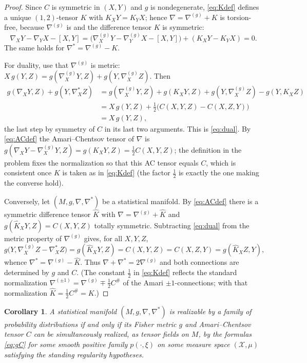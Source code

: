 \documentclass{amsart}
\newtheorem{corollary}{Corollary}
\theoremstyle{definition}
\theoremstyle{remark}
\begin{document}
\begin{proof}
Since $C$ is symmetric in $(X,Y)$ and $g$ is nondegenerate, \eqref{eq:Kdef}
defines a unique $(1,2)$-tensor $K$ with $K_{X}Y=K_{Y}X$; hence
$\nabla=\nabla^{(g)}+K$ is torsion-free, because $\nabla^{(g)}$ is and the
difference tensor $K$ is symmetric:
\[
  \nabla_{X}Y-\nabla_{Y}X-[X,Y]
   =\bigl(\nabla^{(g)}_{X}Y-\nabla^{(g)}_{Y}X-[X,Y]\bigr)+(K_{X}Y-K_{Y}X)=0 .
\]
The same holds for $\nabla^{*}=\nabla^{(g)}-K$.

For duality, use that $\nabla^{(g)}$ is metric:
$X\,g(Y,Z)=g(\nabla^{(g)}_{X}Y,Z)+g(Y,\nabla^{(g)}_{X}Z)$. Then
\begin{align*}
  g(\nabla_{X}Y,Z)+g(Y,\nabla^{*}_{X}Z)
   &=g(\nabla^{(g)}_{X}Y,Z)+g(K_{X}Y,Z)
     +g(Y,\nabla^{(g)}_{X}Z)-g(Y,K_{X}Z)\\
   &=X\,g(Y,Z)+\tfrac12\bigl(C(X,Y,Z)-C(X,Z,Y)\bigr)\\
   &=X\,g(Y,Z),
\end{align*}
the last step by symmetry of $C$ in its last two arguments. This is
\eqref{eq:dual}. By \eqref{eq:ACdef} the Amari--Chentsov tensor of $\nabla$ is
$g(\nabla_{X}Y-\nabla^{(g)}_{X}Y,Z)=g(K_{X}Y,Z)=\tfrac12C(X,Y,Z)$; the
definition in the problem fixes the normalization so that this AC tensor equals
$C$, which is consistent once $K$ is taken as in \eqref{eq:Kdef} (the factor
$\tfrac12$ is exactly the one making the converse hold).

Conversely, let $(M,g,\nabla,\nabla^{*})$ be a statistical manifold. By
\eqref{eq:ACdef} there is a symmetric difference tensor $\widehat K$ with
$\nabla=\nabla^{(g)}+\widehat K$ and $g(\widehat K_{X}Y,Z)=C(X,Y,Z)$ totally
symmetric. Subtracting \eqref{eq:dual} from the metric property of
$\nabla^{(g)}$ gives, for all $X,Y,Z$,
\[
  g\bigl(Y,\nabla^{(g)}_{X}Z-\nabla^{*}_{X}Z\bigr)
    =g(\widehat K_{X}Y,Z)=C(X,Y,Z)=C(X,Z,Y)=g(\widehat K_{X}Z,Y),
\]
whence $\nabla^{*}=\nabla^{(g)}-\widehat K$. Thus $\nabla+\nabla^{*}=2\nabla^{(g)}$
and both connections are determined by $g$ and $C$. (The constant $\tfrac12$ in
\eqref{eq:Kdef} reflects the standard normalization $\nabla^{(\pm1)}=
\nabla^{(g)}\mp\tfrac12 C^{\#}$ of the Amari $\pm1$-connections; with that
normalization $\widehat K=\tfrac12 C^{\#}=K$.)
\end{proof}

\begin{corollary}\label{cor:reduce}
A statistical manifold $(M,g,\nabla,\nabla^{*})$ is realizable by a family of
probability distributions if and only if its Fisher metric $g$ and
Amari--Chentsov tensor $C$ can be simultaneously realized, as tensor fields on
$M$, by the formulas \eqref{eq:gC} for some smooth positive family
$p(\cdot,\xi)$ on some measure space $(\mathcal X,\mu)$ satisfying the standing
regularity hypotheses.
\end{corollary}
\end{document}
